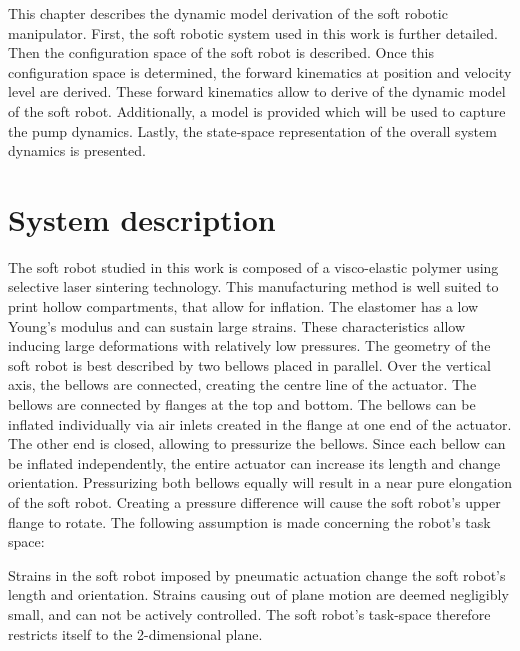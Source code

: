 \label{chap2}

This chapter describes the dynamic model derivation of the soft robotic manipulator. First, the soft robotic system used in this work is further detailed. Then the configuration space of the soft robot is described. Once this configuration space is determined, the forward kinematics at position and velocity level are derived. These forward kinematics allow to derive of the dynamic model of the soft robot. Additionally, a model is provided which will be used to capture the pump dynamics. Lastly, the state-space representation of the overall system dynamics is presented.



\section{System description}

The soft robot studied in this work is composed of a visco-elastic polymer using selective laser sintering technology. This manufacturing method is well suited to print hollow compartments, that allow for inflation. The elastomer has a low Young's modulus and can sustain large strains. These characteristics allow inducing large deformations with relatively low pressures. The geometry of the soft robot is best described by two bellows placed in parallel. Over the vertical axis, the bellows are connected, creating the centre line of the actuator. The bellows are connected by flanges at the top and bottom. The bellows can be inflated individually via air inlets created in the flange at one end of the actuator. The other end is closed, allowing to pressurize the bellows. Since each bellow can be inflated independently, the entire actuator can increase its length and change orientation. Pressurizing both bellows equally will result in a near pure elongation of the soft robot. Creating a pressure difference will cause the soft robot's upper flange to rotate. The following assumption is made concerning the robot's task space:

\begin{theorem}
Strains in the soft robot imposed by pneumatic actuation change the soft robot's length and orientation. Strains causing out of plane motion are deemed negligibly small, and can not be actively controlled. The soft robot's task-space therefore restricts itself to the 2-dimensional plane.
\end{theorem}


